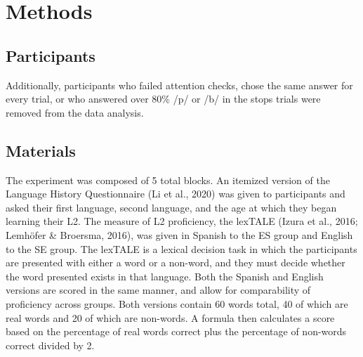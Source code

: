 \documentclass[
  man,floatsintext]{apa6}
\begin{document}
\hypertarget{methods}{%
\section{Methods}\label{methods}}

\hypertarget{participants}{%
\subsection{Participants}\label{participants}}

Additionally, participants who failed attention checks, chose the same answer for every trial, or who answered over 80\% /p/ or /b/ in the stops trials were removed from the data analysis.

\hypertarget{materials}{%
\subsection{Materials}\label{materials}}

The experiment was composed of 5 total blocks.
An itemized version of the Language History Questionnaire (Li et al., 2020) was given to participants and asked their first language, second language, and the age at which they began learning their L2.
The measure of L2 proficiency, the lexTALE (Izura et al., 2016; Lemhöfer \& Broersma, 2016), was given in Spanish to the ES group and English to the SE group.
The lexTALE is a lexical decision task in which the participants are presented with either a word or a non-word, and they must decide whether the word presented exists in that language.
Both the Spanish and English versions are scored in the same manner, and allow for comparability of proficiency across groups. Both versions contain 60 words total, 40 of which are real words and 20 of which are non-words. A formula then calculates a score based on the percentage of real words correct plus the percentage of non-words correct divided by 2.
\end{document}
